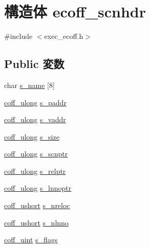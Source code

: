 \hypertarget{structecoff__scnhdr}{
\section{構造体 ecoff\_\-scnhdr}
\label{structecoff__scnhdr}
}


{\ttfamily \#include $<$exec\_\-ecoff.h$>$}\subsection*{Public 変数}
\begin{DoxyCompactItemize}
\item 
char \hyperlink{structecoff__scnhdr_a4fb9e6492e82bfd3a5d8b47fd73e4938}{s\_\-name} \mbox{[}8\mbox{]}
\item 
\hyperlink{ecoff__machdep_8h_a8465ac1e3c6711a52d3103550d8122fc}{coff\_\-ulong} \hyperlink{structecoff__scnhdr_ab14630f315eafd79c3aa3f0562acc63d}{s\_\-paddr}
\item 
\hyperlink{ecoff__machdep_8h_a8465ac1e3c6711a52d3103550d8122fc}{coff\_\-ulong} \hyperlink{structecoff__scnhdr_a54c259d6d87d6926066f269c3c82c71c}{s\_\-vaddr}
\item 
\hyperlink{ecoff__machdep_8h_a8465ac1e3c6711a52d3103550d8122fc}{coff\_\-ulong} \hyperlink{structecoff__scnhdr_af08bd0d7cade9682d92a3d1be210797c}{s\_\-size}
\item 
\hyperlink{ecoff__machdep_8h_a8465ac1e3c6711a52d3103550d8122fc}{coff\_\-ulong} \hyperlink{structecoff__scnhdr_a09d545c338b37a99ca276eab7a5c91a9}{s\_\-scnptr}
\item 
\hyperlink{ecoff__machdep_8h_a8465ac1e3c6711a52d3103550d8122fc}{coff\_\-ulong} \hyperlink{structecoff__scnhdr_afc5396a9c8f0c041cc8d52cd3583f319}{s\_\-relptr}
\item 
\hyperlink{ecoff__machdep_8h_a8465ac1e3c6711a52d3103550d8122fc}{coff\_\-ulong} \hyperlink{structecoff__scnhdr_a502686f8c84608c561c66c9d861ebee0}{s\_\-lnnoptr}
\item 
\hyperlink{ecoff__machdep_8h_a650e29ece54d87a3fb9db4505a0efb68}{coff\_\-ushort} \hyperlink{structecoff__scnhdr_a55e39a8787cbb4e607f56abcc84c53d5}{s\_\-nreloc}
\item 
\hyperlink{ecoff__machdep_8h_a650e29ece54d87a3fb9db4505a0efb68}{coff\_\-ushort} \hyperlink{structecoff__scnhdr_a8164246b07a75d1bb9f7772ef149641c}{s\_\-nlnno}
\item 
\hyperlink{ecoff__machdep_8h_ab38b7c66cf20051c3d7bb0f268d1e2a5}{coff\_\-uint} \hyperlink{structecoff__scnhdr_a2d1150bb9b508c12cd35ffb1810f125f}{s\_\-flags}
\end{DoxyCompactItemize}


